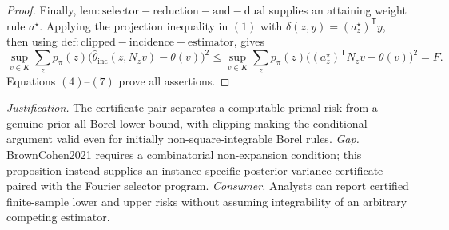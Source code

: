 \documentclass{article}
\begin{document}
\begin{proof}
Finally, \(\mathrm{lem:selector-reduction-and-dual}\) supplies an attaining weight rule \(a^{\star}\).  Applying the projection inequality in \((1)\) with \(\delta(z,y)=(a_z^{\star})^{\mathsf T}y\), then using \(\mathrm{def:clipped-incidence-estimator}\), gives
\[
 \sup_{v\in K}\sum_zp_\pi(z)
 \bigl(\widehat\theta_{\mathrm{inc}}(z,N_zv)-\theta(v)\bigr)^2
 \le
 \sup_{v\in K}\sum_zp_\pi(z)
 \bigl((a_z^{\star})^{\mathsf T}N_zv-\theta(v)\bigr)^2
 =F.                                                                              \tag{7}
\]
Equations \((4)\)--\((7)\) prove all assertions.
\end{proof}
\par\smallskip\noindent \textit{Justification.} The certificate pair separates a computable primal risk from a genuine-prior all-Borel lower bound, with clipping making the conditional argument valid even for initially non-square-integrable Borel rules. \textit{Gap.} BrownCohen2021 requires a combinatorial non-expansion condition; this proposition instead supplies an instance-specific posterior-variance certificate paired with the Fourier selector program. \textit{Consumer.} Analysts can report certified finite-sample lower and upper risks without assuming integrability of an arbitrary competing estimator.
\end{document}
